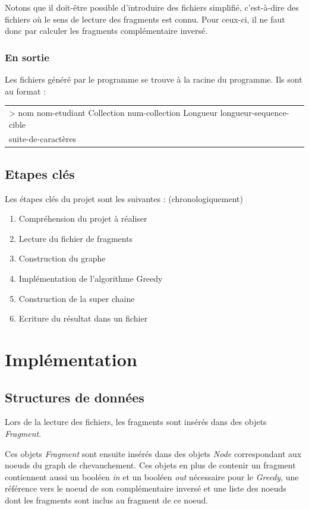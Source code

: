 \documentclass[12pt,a4paper,final]{article}
\begin{document}
Notons que il doit-être possible d'introduire des fichiers simplifié, c'est-à-dire des fichiers où le sens de lecture des fragments est connu. Pour ceux-ci, il ne faut donc par calculer les fragments complémentaire inversé.

\subsubsection{En sortie}
Les fichiers généré par le programme se trouve à la racine du programme. Ils sont au format : 

\begin{table}[!ht]
\centering
\begin{tabular}{|l|}
	\hline
	> nom nom-etudiant Collection num-collection Longueur longueur-sequence-cible \\
	suite-de-caractères\\
	\hline
\end{tabular}
\end{table}

\subsection{Etapes clés}
Les étapes clés du projet sont les suivantes : (chronologiquement)
\begin{enumerate}
\item Compréhension du projet à réaliser
\item Lecture du fichier de fragments
\item Construction du graphe
\item Implémentation de l'algorithme Greedy 
\item Construction de la super chaine 
\item Ecriture du résultat dans un fichier
\end{enumerate}

\newpage
\section{Implémentation}
\subsection{Structures de données}

Lors de la lecture des fichiers, les fragments sont insérés dans des objets \textit{Fragment}.\medskip

Ces objets \textit{Fragment} sont ensuite insérés dans des objets \textit{Node} correspondant aux noeuds du graph de chevauchement.  Ces objets en plus de contenir un fragment contiennent aussi un booléen \textit{in} et un booléen \textit{out} nécessaire pour le \textit{Greedy}, une référence vers le noeud de son complémentaire inversé et une liste des noeuds dont les fragments sont inclus au fragment de ce noeud.\medskip
\end{document}
